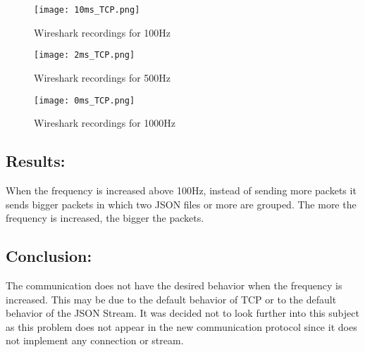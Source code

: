	\begin{figure}[h]
		\centering
		\texttt{[image: 10ms\_TCP.png]}
		\caption{Wireshark recordings for 100Hz}
		\label{fig:10ms_tcp}
	\end{figure}
	\begin{figure}[h]
		\centering
		\texttt{[image: 2ms\_TCP.png]}
		\caption{Wireshark recordings for 500Hz}
		\label{fig:2ms_tcp}
	\end{figure}
	\begin{figure}[h]
		\centering
		\texttt{[image: 0ms\_TCP.png]}
		\caption{Wireshark recordings for 1000Hz}
		\label{fig:0ms_tcp}
	\end{figure}


\subsection*{Results:}

When the frequency is increased above 100Hz, instead of sending more packets it sends bigger packets in which two \gls{JSON} files or more are grouped. The more the frequency is increased, the bigger the packets. 

\subsection*{Conclusion:}

The communication does not have the desired behavior when the frequency is increased. This may be due to the default behavior of TCP or to the default behavior of the JSON Stream. It was decided not to look further into this subject as this problem does not appear in the new communication protocol since it does not implement any connection or stream.